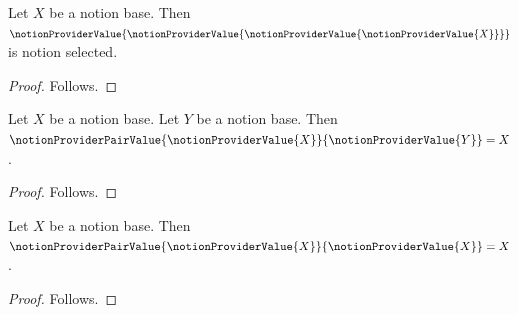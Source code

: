 

\begin{proposition}\label{notion_provider_rule_imported}
    Let $X$ be a notion base.
    Then $\notionProviderValue{
        \notionProviderValue{
            \notionProviderValue{
                \notionProviderValue{X}}}}$
        is notion selected.
\end{proposition}
\begin{proof}
    Follows.
\end{proof}

\begin{proposition}\label{notion_provider_same_owner_distinct_arguments}
    Let $X$ be a notion base.
    Let $Y$ be a notion base.
    Then $\notionProviderPairValue
        {\notionProviderValue{X}}
        {\notionProviderValue{Y}}=X$.
\end{proposition}
\begin{proof}
    Follows.
\end{proof}

\begin{proposition}\label{notion_provider_repeated_equal_core}
    Let $X$ be a notion base.
    Then $\notionProviderPairValue
        {\notionProviderValue{X}}
        {\notionProviderValue{X}}=X$.
\end{proposition}
\begin{proof}
    Follows.
\end{proof}
